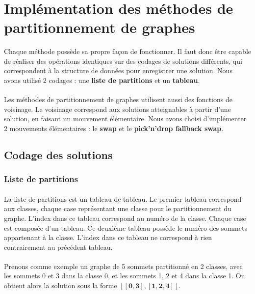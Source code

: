 \documentclass[12pt]{article}
\begin{document}
\section{Implémentation des méthodes de partitionnement de graphes}

\paragraph{}Chaque méthode possède sa propre façon de fonctionner. Il faut donc être capable de réaliser des opérations identiques sur des codages de solutions différents, qui correspondent à la structure de données pour enregistrer une solution. Nous avons utilisé 2 codages : une \textbf{liste de partitions} et un \textbf{tableau}.
\paragraph{}Les méthodes de partitionnement de graphes utilisent aussi des fonctions de voisinage. Le voisinage correspond aux solutions atteignables à partir d'une solution, en faisant un mouvement élémentaire. Nous avons choisi d'implémenter 2 mouvements élémentaires : le \textbf{swap} et le \textbf{pick'n'drop fallback swap}.

\subsection{Codage des solutions}

\subsubsection{Liste de partitions}

\paragraph{}La liste de partitions est un tableau de tableau. Le premier tableau correspond aux classes, chaque case représentant une classe pour le partitionnement du graphe. L'index dans ce tableau correspond au numéro de la classe. Chaque case est composée d'un tableau. Ce deuxième tableau possède le numéro des sommets appartenant à la classe. L'index dans ce tableau ne correspond à rien contrairement au précédent tableau.

\paragraph{}Prenons comme exemple un graphe de 5 sommets partitionné en 2 classes, avec les sommets 0 et 3 dans la classe 0, et les sommets 1, 2 et 4 dans la classe 1. On obtient alors la solution sous la forme $\mathbf{[[0,3],[1,2,4]]}$.
\end{document}
